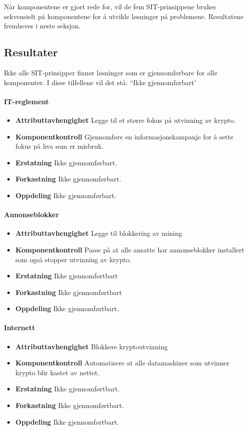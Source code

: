 Når komponentene er gjort rede for, vil de fem SIT-prinsippene brukes sekvensielt på komponentene for å utvikle løsninger på problemene. Resultatene fremheves i neste seksjon. 


\subsection{Resultater}
Ikke alle SIT-prinsipper finner løsninger som er gjennomførbare for alle komponenter. I disse tilfellene vil det stå: ``Ikke gjennomførbart'

\paragraph{IT-reglement}
\begin{itemize}
    \item \textbf{Attributtavhengighet} Legge til et større fokus på utvinning av krypto.
    \item \textbf{Komponentkontroll} Gjennomføre en informasjonskampanje for å sette fokus på hva som er misbruk.
    \item \textbf{Erstatning} Ikke gjennomførbart.
    \item \textbf{Forkastning} Ikke gjennomførbart.
    \item \textbf{Oppdeling} Ikke gjennomførbart. 
\end{itemize}

\paragraph{Annonseblokker}
\begin{itemize}
    \item \textbf{Attributtavhengighet} Legge til blokkering av mining 
    \item \textbf{Komponentkontroll} Passe på at alle ansatte har annonseblokker installert som også stopper utvinning av krypto.
    \item \textbf{Erstatning} Ikke gjennomførtbart
    \item \textbf{Forkastning} Ikke gjennomførtbart
    \item \textbf{Oppdeling} Ikke gjennomførtbart.
\end{itemize}

\paragraph{Internett}
\begin{itemize}
    \item \textbf{Attributtavhengighet} Blokkere kryptoutvinning
    \item \textbf{Komponentkontroll} Automatisere at alle datamaskiner som utvinner krypto blir kastet av nettet.
    \item \textbf{Erstatning} Ikke gjennomførtbart.
    \item \textbf{Forkastning} Ikke gjennomførtbart.
    \item \textbf{Oppdeling} Ikke gjennomførtbart.
\end{itemize}


